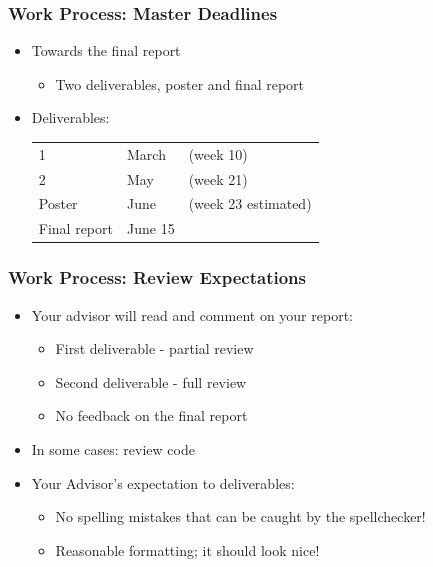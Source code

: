 \documentclass[hyperref={pdfpagelabels=false}, aspectratio=1610,handout]{beamer}
\begin{document}
\begin{frame}
\frametitle{Work Process: Master Deadlines}
\begin{block}{}
 \begin{itemize}
  \item Towards the final report
  \begin{itemize}
  	\item Two deliverables, poster and final report
  \end{itemize}
  \item Deliverables:\\
  \begin{tabular}{lll}
  1 & March & (week 10) \\
  2 & May & (week 21) \\
  Poster & June & (week 23 estimated) \\
  Final report & June 15 &  \\
  \end{tabular}
 \end{itemize}
\end{block}
\end{frame}

\begin{frame}
\frametitle{Work Process: Review Expectations}
\begin{block}{}
 \begin{itemize}
  \item Your advisor will read and comment on your report:
  \begin{itemize}
  	\item First deliverable - partial review
  	\item Second deliverable - full review
	\item No feedback on the final report
  \end{itemize}
  \item In some cases: review code
  \item Your Advisor's expectation to deliverables:
  \begin{itemize}
  	\item No spelling mistakes that can be caught by the spellchecker!
	\item Reasonable formatting; it should look nice!
  \end{itemize}
 \end{itemize}
\end{block}
\end{frame}
\end{document}
